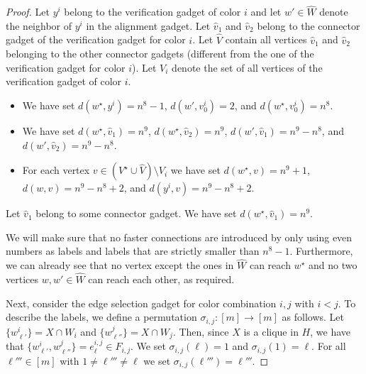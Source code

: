\documentclass[a4paper,UKenglish,cleveref, autoref, thm-restate, anonymous]{lipics-v2021}
\begin{document}
\begin{proof}
Let $y^i$ belong to the verification gadget of color $i$ and let $w'\in \hat{W}$ denote the neighbor of $y^i$ in the alignment gadget. Let $\hat{v}_1$ and $\hat{v}_2$ belong to the connector gadget of the verification gadget for color $i$. Let $\hat{V}$ contain all vertices $\hat{v}_1$ and $\hat{v}_2$ belonging to the other connector gadgets (different from the one of the verification gadget for color $i$). Let $V_i$ denote the set of all vertices of the verification gadget of color $i$.
\begin{itemize}
    \item We have set $d(w^\star,y^i)=n^8-1$, $d(w',v^i_0)=2$, and $d(w^\star,v^i_0)=n^8$.
    \item We have set $d(w^\star,\hat{v}_1)=n^9$, $d(w^\star,\hat{v}_2)=n^9$, $d(w',\hat{v}_1)=n^9-n^8$, and $d(w',\hat{v}_2)=n^9-n^8$.
    \item For each vertex $v\in (V^\star\cup \hat{V})\setminus V_i$ we have set $d(w^\star,v)=n^9+1$, $d(w,v)=n^9-n^8+2$, and $d(y^i,v)=n^9-n^8+2$.
\end{itemize}
Let $\hat{v}_1$ belong to some connector gadget. We have set $d(w^\star,\hat{v}_1)=n^9$.

We will make sure that no faster connections are introduced by only using even numbers as labels and labels that are strictly smaller than $n^8-1$. Furthermore, we can already see that no vertex except the ones in $\hat{W}$ can reach $w^\star$ and no two vertices $w,w'\in\hat{W}$ can reach each other, as required.














Next, consider the edge selection gadget for color combination $i,j$ with $i<j$.
To describe the labels, we define a permutation $\sigma_{i,j}:[m]\rightarrow [m]$ as follows. Let $\{w^i_{\ell'}\}=X\cap W_i$ and $\{w^j_{\ell''}\}=X\cap W_j$. Then, since $X$ is a clique in $H$, we have that $\{w^i_{\ell'},w^j_{\ell''}\}=e^{i,j}_\ell\in F_{i,j}$. We set $\sigma_{i,j}(\ell)=1$ and $\sigma_{i,j}(1)=\ell$. For all $\ell'''\in[m]$ with $1\neq\ell'''\neq\ell$ we set $\sigma_{i,j}(\ell''')=\ell'''$.


\end{proof}
\end{document}
